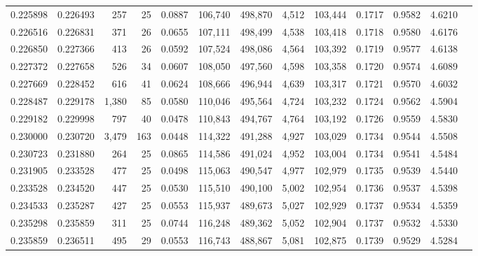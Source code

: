 \begin{tabular}{rrrrrrrrrrrrr}
0.225898 & 0.226493 &   257 &  25 &                                     0.0887 & 106,740 & 498,870 &   4,512 & 103,444 & 0.1717 & 0.9582 & 4.6210 \\
0.226516 & 0.226831 &   371 &  26 &                                     0.0655 & 107,111 & 498,499 &   4,538 & 103,418 & 0.1718 & 0.9580 & 4.6176 \\
0.226850 & 0.227366 &   413 &  26 &                                     0.0592 & 107,524 & 498,086 &   4,564 & 103,392 & 0.1719 & 0.9577 & 4.6138 \\
0.227372 & 0.227658 &   526 &  34 &                                     0.0607 & 108,050 & 497,560 &   4,598 & 103,358 & 0.1720 & 0.9574 & 4.6089 \\
0.227669 & 0.228452 &   616 &  41 &                                     0.0624 & 108,666 & 496,944 &   4,639 & 103,317 & 0.1721 & 0.9570 & 4.6032 \\
0.228487 & 0.229178 & 1,380 &  85 &                                     0.0580 & 110,046 & 495,564 &   4,724 & 103,232 & 0.1724 & 0.9562 & 4.5904 \\
0.229182 & 0.229998 &   797 &  40 &                                     0.0478 & 110,843 & 494,767 &   4,764 & 103,192 & 0.1726 & 0.9559 & 4.5830 \\
0.230000 & 0.230720 & 3,479 & 163 &                                     0.0448 & 114,322 & 491,288 &   4,927 & 103,029 & 0.1734 & 0.9544 & 4.5508 \\
0.230723 & 0.231880 &   264 &  25 &                                     0.0865 & 114,586 & 491,024 &   4,952 & 103,004 & 0.1734 & 0.9541 & 4.5484 \\
0.231905 & 0.233528 &   477 &  25 &                                     0.0498 & 115,063 & 490,547 &   4,977 & 102,979 & 0.1735 & 0.9539 & 4.5440 \\
0.233528 & 0.234520 &   447 &  25 &                                     0.0530 & 115,510 & 490,100 &   5,002 & 102,954 & 0.1736 & 0.9537 & 4.5398 \\
0.234533 & 0.235287 &   427 &  25 &                                     0.0553 & 115,937 & 489,673 &   5,027 & 102,929 & 0.1737 & 0.9534 & 4.5359 \\
0.235298 & 0.235859 &   311 &  25 &                                     0.0744 & 116,248 & 489,362 &   5,052 & 102,904 & 0.1737 & 0.9532 & 4.5330 \\
0.235859 & 0.236511 &   495 &  29 &                                     0.0553 & 116,743 & 488,867 &   5,081 & 102,875 & 0.1739 & 0.9529 & 4.5284 \\

\end{tabular}

